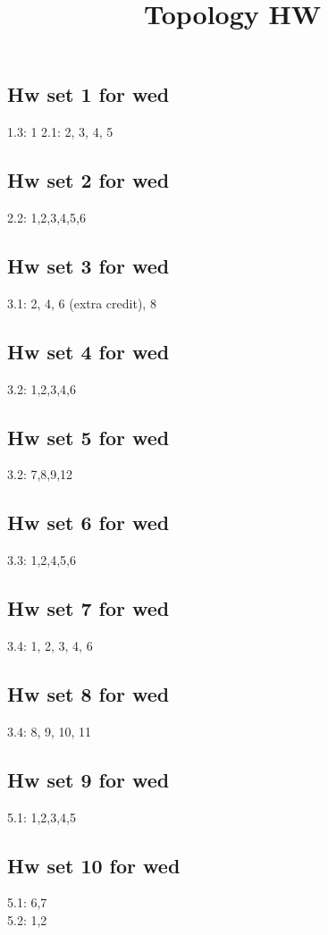 \documentclass{amsart}
\numberwithin{equation}{section}
\theoremstyle{definition}
\theoremstyle{remark}
\begin{document}
\title{Topology HW}
\maketitle
\subsection*{Hw set 1 for wed}
1.3: 1  
2.1: 2, 3, 4, 5  
\subsection*{Hw set 2 for wed}
2.2: 1,2,3,4,5,6
\subsection*{Hw set 3 for wed}
3.1: 2, 4, 6 (extra credit), 8
\subsection*{Hw set 4 for wed}
3.2: 1,2,3,4,6
\subsection*{Hw set 5 for wed}
3.2: 7,8,9,12
\subsection*{Hw set 6 for wed}
3.3: 1,2,4,5,6   
\subsection*{Hw set 7 for wed}
3.4: 1, 2, 3, 4, 6
\subsection*{Hw set 8 for wed}
3.4: 8, 9, 10, 11
\subsection*{Hw set 9 for wed}
5.1: 1,2,3,4,5
\subsection*{Hw set 10 for wed}
5.1: 6,7 \\
5.2: 1,2   
\end{document}
